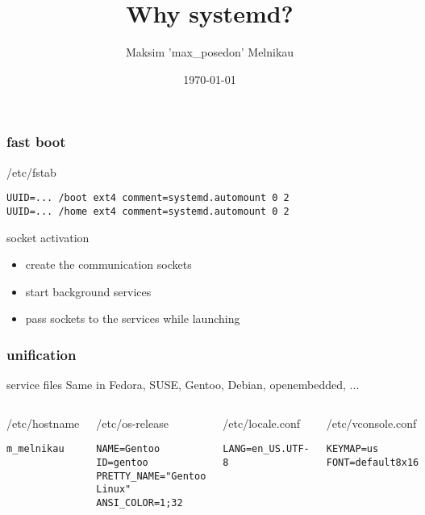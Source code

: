 \documentclass{beamer}
\begin{document}
\title{Why systemd?}
\author{Maksim 'max\_posedon' Melnikau}
\date{\today}
\frame{\titlepage}

\begin{frame}[fragile]
    \frametitle{fast boot}
    \begin{block}{/etc/fstab}
    \begin{verbatim}
UUID=... /boot ext4 comment=systemd.automount 0 2
UUID=... /home ext4 comment=systemd.automount 0 2
    \end{verbatim}
    \end{block}
    \begin{block}{socket activation}
    \begin{itemize}
        \item create the communication sockets
        \item start background services
        \item pass sockets to the services while launching
    \end{itemize}
    \end{block}
\end{frame}

\begin{frame}[fragile]
    \frametitle{unification}
    \begin{block}{service files}
    Same in Fedora, SUSE, Gentoo, Debian, openembedded, ...
    \end{block}

    \begin{columns}[t]
            \begin{block}{/etc/hostname}
                \begin{verbatim}
m_melnikau
                \end{verbatim}
            \end{block}
            \begin{block}{/etc/os-release}
                \begin{verbatim}
NAME=Gentoo
ID=gentoo
PRETTY_NAME="Gentoo Linux"
ANSI_COLOR=1;32
                \end{verbatim}
            \end{block}

        \begin{block}{/etc/locale.conf}
                \begin{verbatim}
LANG=en_US.UTF-8
                \end{verbatim}
            \end{block}
            \begin{block}{/etc/vconsole.conf}
                \begin{verbatim}
KEYMAP=us
FONT=default8x16
                \end{verbatim}
            \end{block}
    \end{columns}

\end{frame}
\end{document}
